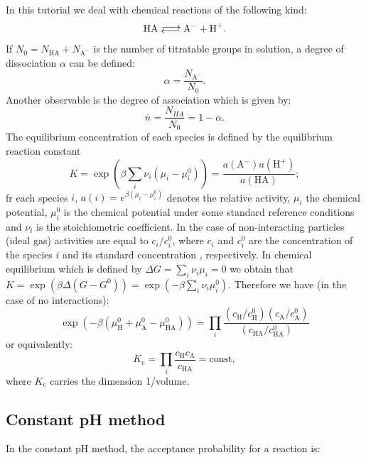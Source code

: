 \documentclass[
a4paper,                        %
11pt,                           %
twoside,                        %
footsepline,                    %
headsepline,                    %
headexclude,                    %
footexclude,                    %
pagesize,                       %
]{scrartcl}
\begin{document}
In this tutorial we deal with chemical reactions of the following kind:
\begin{equation}\label{disso}
\ce{HA <--> A- + H+}\text{.}
\end{equation}
If $N_0 = N_{\text{HA}} + N_{\text{A}^-}$ is the number of titratable groups in solution, a degree of dissociation $\alpha$ can be defined:
\begin{equation}\label{alpha}
\alpha = \frac{N_{\text{A}^-}}{N_0}.
\end{equation}
Another observable is the degree of association which is given by:
\begin{equation*}
\overline{n}=\frac{N_{HA}}{N_0}=1-\alpha.
\end{equation*}
The equilibrium concentration of each species is defined by the equilibrium reaction constant
\begin{equation}
K =\exp(\beta \sum_i \nu_i(\mu_i-\mu_i^0) )= \frac{a(\text{A}^-)a(\text{H}^+)}{a(\text{HA})};
\end{equation}
fr each species $i$, $a(i)=e^{\beta(\mu_i-\mu_i^0)}$ denotes the relative activity, $\mu_i$ the chemical potential, $\mu_i^0$ is the chemical potential under some standard reference conditions and $\nu_i$ is the stoichiometric coefficient. In the case of non-interacting particles (ideal gas) activities are equal to $c_i/c_{i}^{0}$, where $c_i$ and $c_{i}^{0}$ are the concentration of the species $i$ and its standard concentration , respectively. In chemical equilibrium which is defined by $\Delta G=\sum_i \nu_i \mu_i=0$ we obtain that $K=\exp(\beta \Delta (G-G^0))=\exp(-\beta \sum_i \nu_i \mu_i^0)$.
Therefore we have (in the case of no interactions):
\begin{equation}
\exp(-\beta ( \mu_\text{H}^0+\mu_\text{A}^0-\mu_{\text{HA}}^0))=
\prod_i \frac{(c_{\text{H}}/c^0_\text{H})(c_{\text{A}}/c^0_\text{A})}{(c_{\text{HA}}/c^0_{\text{HA}})}
\end{equation}
or equivalently:
\begin{equation}
K_{\text{c}} = \prod_i \frac{c_{\text{H}}c_{\text{A}}}{c_{\text{HA}}}=\text{const},
\end{equation}
where $K_{\text{c}}$ carries the dimension 1/volume.


\subsection{Constant pH method}

In the constant pH method, the acceptance probability for a reaction is:
\end{document}
